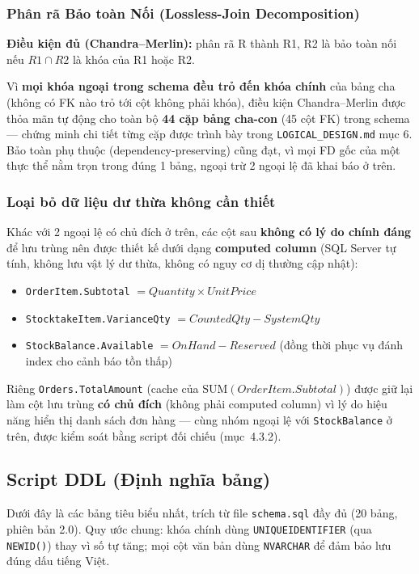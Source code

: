 \subsubsection{Phân rã Bảo toàn Nối (Lossless-Join Decomposition)}
\textbf{Điều kiện đủ (Chandra–Merlin):} phân rã R thành R1, R2 là bảo toàn nối nếu \(R1 \cap R2\) là khóa của R1 hoặc R2.

Vì \textbf{mọi khóa ngoại trong schema đều trỏ đến khóa chính} của bảng cha (không có FK nào trỏ tới cột không phải khóa), điều kiện Chandra–Merlin được thỏa mãn tự động cho toàn bộ \textbf{44 cặp bảng cha-con} (45 cột FK) trong schema — chứng minh chi tiết từng cặp được trình bày trong \texttt{LOGICAL\_DESIGN.md} mục 6. Bảo toàn phụ thuộc (dependency-preserving) cũng đạt, vì mọi FD gốc của một thực thể nằm trọn trong đúng 1 bảng, ngoại trừ 2 ngoại lệ đã khai báo ở trên.

\subsubsection{Loại bỏ dữ liệu dư thừa không cần thiết}
Khác với 2 ngoại lệ có chủ đích ở trên, các cột sau \textbf{không có lý do chính đáng} để lưu trùng nên được thiết kế dưới dạng \textbf{computed column} (SQL Server tự tính, không lưu vật lý dư thừa, không có nguy cơ dị thường cập nhật):
\begin{itemize}
    \item \texttt{OrderItem.Subtotal} \(= Quantity \times UnitPrice\)
    \item \texttt{StocktakeItem.VarianceQty} \(= CountedQty - SystemQty\)
    \item \texttt{StockBalance.Available} \(= OnHand - Reserved\) (đồng thời phục vụ đánh index cho cảnh báo tồn thấp)
\end{itemize}
Riêng \texttt{Orders.TotalAmount} (cache của \(\text{SUM}(OrderItem.Subtotal)\)) được giữ lại làm cột lưu trùng \textbf{có chủ đích} (không phải computed column) vì lý do hiệu năng hiển thị danh sách đơn hàng — cùng nhóm ngoại lệ với \texttt{StockBalance} ở trên, được kiểm soát bằng script đối chiếu (mục~4.3.2).

\subsection{Script DDL (Định nghĩa bảng)}

Dưới đây là các bảng tiêu biểu nhất, trích từ file \texttt{schema.sql} đầy đủ (20 bảng, phiên bản 2.0). Quy ước chung: khóa chính dùng \texttt{UNIQUEIDENTIFIER} (qua \texttt{NEWID()}) thay vì số tự tăng; mọi cột văn bản dùng \texttt{NVARCHAR} để đảm bảo lưu đúng dấu tiếng Việt.

